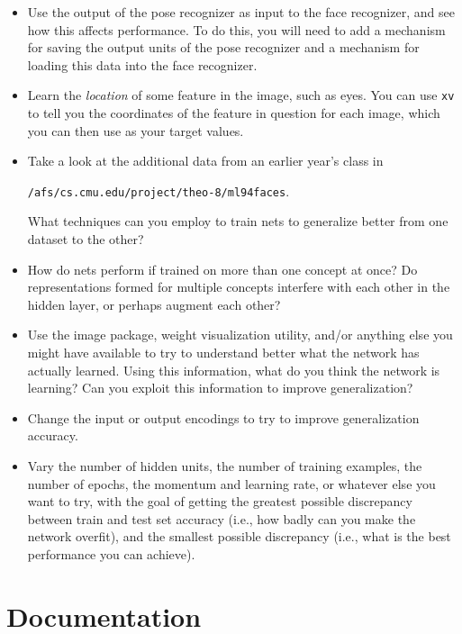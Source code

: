 \begin{itemize}

\item Use the output of the pose recognizer as input to the face
recognizer, and see how this affects performance.  To do this, you will need
to add a mechanism for saving the output units of the pose recognizer and a
mechanism for loading this data into the face recognizer.

\item Learn the {\it location} of some feature in the image, such
as eyes.  You can use {\tt xv} to tell you the coordinates of the feature in
question for each image, which you can then use as your target values.

\item Take a look at the additional data from an earlier year's class in


{\tt /afs/cs.cmu.edu/project/theo-8/ml94faces}.  

What techniques can you
employ to train nets to generalize better from one dataset to the other?

\item How do nets perform if trained on more than one concept at once?
Do representations formed for multiple concepts interfere with each other in
the hidden layer, or perhaps augment each other?

\item Use the image package, weight visualization utility, and/or
anything else you might have available to try to understand better what the
network has actually learned.  Using this information, what do you think the
network is learning?  Can you exploit this information to improve
generalization?

\item Change the input or output encodings to try to improve
generalization accuracy.

\item Vary the number of hidden units, the number of training examples,
the number of epochs, the momentum and learning rate, or whatever else you
want to try, with the goal of getting the greatest possible discrepancy
between train and test set accuracy (i.e., how badly can you make the network
overfit), and the smallest possible discrepancy (i.e., what is the best
performance you can achieve).

\end{itemize}

\section{Documentation}
\label{docs}

